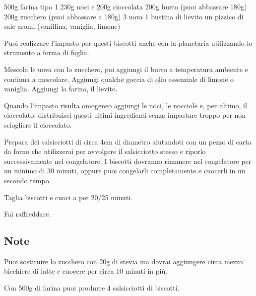 \begin{ingreds}
	500g farina  tipo 1
	230g noci e 
	200g cioccolata
	200g burro (puoi abbassare 180g)
	200g zucchero (puoi abbassare a 180g)
	3 uova 
	1 bustina di lievito
	un pizzico di sale
	aromi (vanillina, vaniglia, limone)

\end{ingreds}

\begin{method}
Puoi realizzare l'impasto per questi biscotti anche con la planetaria utilizzando lo strumento a forma di foglia.

Mescola le uova con lo zucchero, poi aggiungi il burro a temperatura ambiente e continua a mescolare. Aggiungi qualche goccia di olio essenziale di limone o vaniglia. Aggiungi la farina, il lievito.

Quando l'impasto risulta omogeneo aggiungi le noci, le nocciole e, per ultimo, il cioccolato: distribuisci questi ultimi ingredienti senza impastare troppo per non sciogliere il cioccolato.
	
Prepara dei salsicciotti di circa 4cm di diametro aiutandoti con un pezzo di carta da forno che utilizzerai per avvolgere il salsicciotto stesso e riporlo successivamente nel congelatore. I biscotti dovranno rimanere nel congelatore per un minimo di 30 minuti, oppure puoi congelarli completamente e cuocerli in un secondo tempo.
	
Taglia biscotti e cuoci a  per 20/25 minuti.

Fai raffreddare.

\end{method}

\subsection*{Note}
		Puoi sostituire lo zucchero con 20g di stevia ma dovrai aggiungere circa mezzo bicchiere di latte e cuocere per circa 10 minuti in più.
		
		Con 500g di farina puoi produrre 4 salsicciotti di biscotti.
